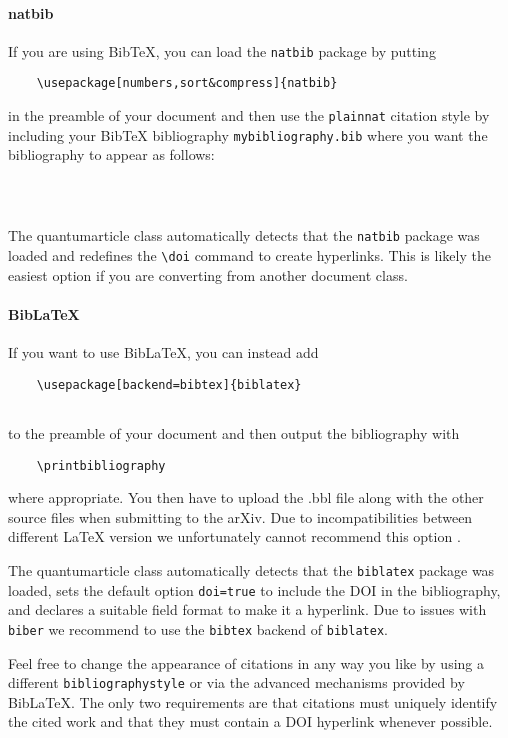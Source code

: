 \documentclass[a4paper,noarxiv,onecolumn]{quantumarticle}
\begin{document}
	\paragraph{natbib}
	If you are using BibTeX, you can load the \texttt{natbib} package by putting
	\begin{verbatim}
	\usepackage[numbers,sort&compress]{natbib}
	\end{verbatim}
	in the preamble of your document and then use the \texttt{plainnat} citation style by including your BibTeX bibliography \texttt{mybibliography.bib} where you want the bibliography to appear as follows:
	\begin{verbatim}
	
	
	\end{verbatim}
	The quantumarticle class automatically detects that the \texttt{natbib} package was loaded and redefines the \texttt{\textbackslash{}doi} command to create hyperlinks.
	This is likely the easiest option if you are converting from another document class.
	
	\paragraph{BibLaTeX}
	If you want to use BibLaTeX, you can instead add
	\begin{verbatim}
	\usepackage[backend=bibtex]{biblatex}
	
	\end{verbatim}
	to the preamble of your document and then output the bibliography with
	\begin{verbatim}
	\printbibliography
	\end{verbatim}
	where appropriate.
	You then have to upload the .bbl file along with the other source files when submitting to the arXiv.
	Due to incompatibilities between different LaTeX version we unfortunately cannot recommend this option \cite{biblatexsubmittingtothearxiv}.
	
	The quantumarticle class automatically detects that the \texttt{biblatex} package was loaded, sets the default option \texttt{doi=true} to include the DOI in the bibliography, and declares a suitable field format to make it a hyperlink.
	Due to issues with \texttt{biber} we recommend to use the \texttt{bibtex} backend of \texttt{biblatex}.
	
	Feel free to change the appearance of citations in any way you like by using a different \texttt{bibliographystyle} or via the advanced mechanisms provided by BibLaTeX.
	The only two requirements are that citations must uniquely identify the cited work and that they must contain a DOI hyperlink whenever possible.
	
\end{document}
